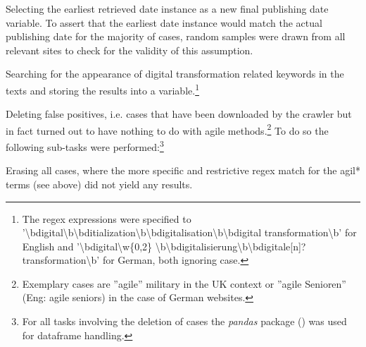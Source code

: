 \begin{compactitem}
\item Selecting the earliest retrieved date instance as a new final publishing date variable. To assert that the earliest date instance would match the actual publishing date for the majority of cases, random samples were drawn from all relevant sites to check for the validity of this assumption. 
\item Searching for the appearance of digital transformation related keywords in the texts and storing the results into a variable.\footnote{The regex expressions were specified to '\textbackslash bdigital\textbackslash b\textbar \textbackslash bditialization\textbackslash b\textbar \textbackslash bdigitalisation\textbackslash b\textbar \textbackslash bdigital transformation\textbackslash b' for English and '\textbackslash bdigital\textbackslash w\{0,2\} \textbackslash b\textbar \textbackslash bdigitalisierung\textbackslash b\textbar \textbackslash bdigitale[n]? transformation\textbackslash b' for German, both ignoring case.}
\item Deleting false positives, i.e. cases that have been downloaded by the crawler but in fact turned out to have nothing to do with agile methods.\footnote{Exemplary cases are ”agile” military in the UK context or ”agile Senioren” (Eng: agile seniors) in the case of German websites.} To do so the following sub-tasks were performed:\footnote{For all tasks involving the deletion of cases the \textit{pandas} package (\cite{McKinney2010}) was used for dataframe handling.}
    \begin{compactitem}
    \item Erasing all cases, where the more specific and restrictive regex match for the agil* terms (see above) did not yield any results. 

\end{compactitem}
\end{compactitem}
